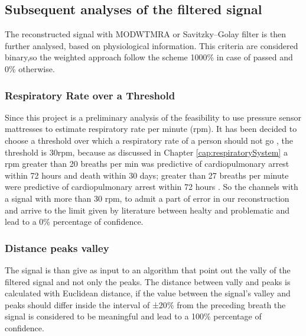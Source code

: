 \vspace*{0.3cm}



\subsection{Subsequent analyses of the filtered signal}
The reconstructed signal with MODWTMRA or Savitzky–Golay filter is then further analysed, based on physiological information. This criteria are considered binary,so the weighted approach follow the scheme 1000\% in case of passed and 0\% otherwise.

\subsubsection{Respiratory Rate over a Threshold}\label{threshold}
Since this project is a preliminary analysis of the feasibility to use pressure sensor mattresses to estimate respiratory rate per minute (rpm). It has been decided to choose a threshold over which a respiratory rate of a person should not go %
, the threshold is 30rpm, because as discussed in Chapter \ref{cap:respiratorySystem} a rpm greater than 20 breaths per min was predictive of cardiopulmonary arrest within 72 hours and death within 30 days\cite{Hong2013HowPatients}; greater than 27 breaths per minute were predictive of cardiopulmonary arrest within 72 hours \cite{Fieselmann1993RespiratoryInpatients}.
So %
the channels with a signal with more than 30 rpm, to admit a part of error in our reconstruction and arrive to the limit given by literature between healty and problematic and lead to a 0\% percentage of confidence.

\subsubsection{Distance peaks valley} \label{cap:Euclidian}
The signal is than give as input to an algorithm that point out the vally of the filtered signal and not only the peaks.
The distance between vally and peaks is calculated with Euclidean distance, if the value between the signal's valley and peaks should differ inside the interval of ±20$\%$ from the preceding breath the signal is considered to be meaningful and lead to a 100\% percentage of confidence.
\vspace*{0.5cm}

